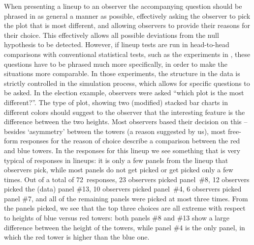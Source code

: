 \documentclass[10pt]{article}\usepackage[]{graphicx}\usepackage[]{color}
\newcommand{\hh}[1]{{\color{magenta} #1}}
\begin{document}
When presenting a lineup to an observer  the accompanying question should be phrased in as general a manner as possible, 
effectively asking the observer to pick the plot that is most different, and allowing observers to provide their reasons for their choice. This effectively allows all possible deviations from the null hypothesis to be detected. 
However, if lineup tests are run in head-to-head comparisons with conventional statistical tests, such as the experiments  in  \cite{majumder:2013}, these questions have to be phrased much more specifically, in order to make the situations more comparable. 
In those experiments, the structure in the data is strictly controlled in the simulation process, which allows for specific questions to be asked. 
In the election example, observers were asked ``which plot is the most different?''. The type of plot, showing two (modified) stacked bar charts in different colors should suggest to the observer that the interesting feature is the difference between the two heights. 
Most observers based their decision on this -- besides  `asymmetry' between the towers (a reason suggested by us), most free-form responses for the reason of choice describe a comparison between the red and blue towers. 
In the responses for this lineup we see something that is very typical of responses in lineups: it is only a few panels from the lineup that observers pick, while most panels do not get picked or get picked only a few times. Out of a total of 72~responses, 23 observers picked panel~\#8, 12 observers picked the (data) panel \#13, 10 observers picked panel~\#4, 6 observers picked panel \#7, and all of the remaining panels were picked at most three times. From the panels picked, we see that the top three choices  are all extreme with respect to heights of blue versus red towers:  both panels \#8 and \#13 show a large difference between the height of the towers, while panel \#4 is the only panel, in which the red tower is higher than the blue one. 


\end{document}

